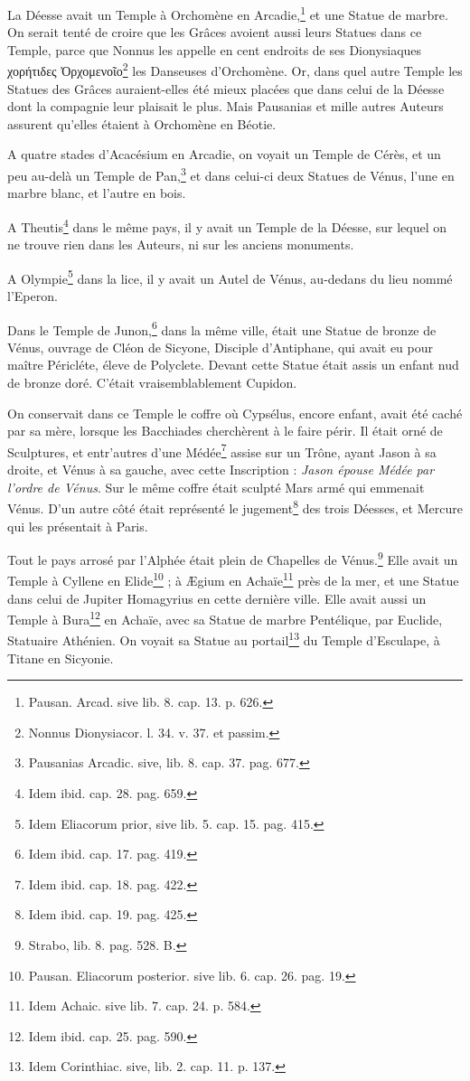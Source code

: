 \documentclass[a4paper, 18pt, oneside]{article}
\begin{document}
La Déesse avait un Temple à Orchomène en Arcadie,\footnote{Pausan. Arcad. sive lib. 8. cap. 13. p. 626.} et une Statue de marbre. On serait tenté de croire que les Grâces avoient aussi leurs Statues dans ce Temple, parce que Nonnus les appelle en cent endroits de ses Dionysiaques χορήτιδες Ὀρχομενοῖο\footnote{Nonnus Dionysiacor. l. 34. v. 37. et passim.} les Danseuses d'Orchomène. Or, dans quel autre Temple les Statues des Grâces auraient-elles été mieux placées que dans celui de la Déesse dont la compagnie leur plaisait le plus. Mais Pausanias et mille autres Auteurs assurent qu'elles étaient à Orchomène en Béotie.

A quatre stades d'Acacésium en Arcadie, on voyait un Temple de Cérès, et un peu au-delà un Temple de Pan,\footnote{Pausanias Arcadic. sive, lib. 8. cap. 37. pag. 677.} et dans celui-ci deux Statues de Vénus, l'une en marbre blanc, et l'autre en bois.

A Theutis\footnote{Idem ibid. cap. 28. pag. 659.} dans le même pays, il y avait un Temple de la Déesse, sur lequel on ne trouve rien dans les Auteurs, ni sur les anciens monuments.

A Olympie\footnote{Idem Eliacorum prior, sive lib. 5. cap. 15. pag. 415.} dans la lice, il y avait un Autel de Vénus, au-dedans du lieu nommé l'Eperon.

Dans le Temple de Junon,\footnote{Idem ibid. cap. 17. pag. 419.} dans la même ville, était une Statue de bronze de Vénus, ouvrage de Cléon de Sicyone, Disciple d'Antiphane, qui avait eu pour maître Péricléte, éleve de Polyclete. Devant cette Statue était assis un enfant nud de bronze doré. C'était vraisemblablement Cupidon.

On conservait dans ce Temple le coffre où Cypsélus, encore enfant, avait été caché par sa mère, lorsque les Bacchiades cherchèrent à le faire périr. Il était orné de Sculptures, et entr'autres d'une Médée\footnote{Idem ibid. cap. 18. pag. 422.} assise sur un Trône, ayant Jason à sa droite, et Vénus à sa gauche, avec cette Inscription : \emph{Jason épouse Médée par l'ordre de Vénus}. Sur le même coffre était sculpté Mars armé qui emmenait Vénus. D'un autre côté était représenté le jugement\footnote{Idem ibid. cap. 19. pag. 425.} des trois Déesses, et Mercure qui les présentait à Paris.

Tout le pays arrosé par l'Alphée était plein de Chapelles de Vénus.\footnote{Strabo, lib. 8. pag. 528. B.} Elle avait un Temple à Cyllene en Elide\footnote{Pausan. Eliacorum posterior. sive lib. 6. cap. 26. pag. 19.} ; à Ægium en Achaïe\footnote{Idem Achaic. sive lib. 7. cap. 24. p. 584.} près de la mer, et une Statue dans celui de Jupiter Homagyrius en cette dernière ville. Elle avait aussi un Temple à Bura\footnote{Idem ibid. cap. 25. pag. 590.} en Achaïe, avec sa Statue de marbre Pentélique, par Euclide, Statuaire Athénien. On voyait sa Statue au portail\footnote{Idem Corinthiac. sive, lib. 2. cap. 11. p. 137.} du Temple d'Esculape, à Titane en Sicyonie.
\end{document}
